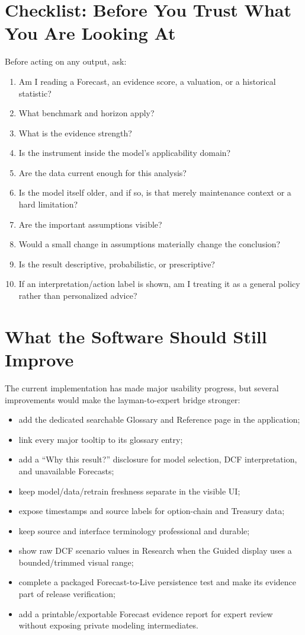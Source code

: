 \documentclass[11pt]{article}
\begin{document}
\section{Checklist: Before You Trust What You Are Looking At}
Before acting on any output, ask:
\begin{enumerate}[itemsep=0.2em]
\item Am I reading a Forecast, an evidence score, a valuation, or a historical statistic?
\item What benchmark and horizon apply?
\item What is the evidence strength?
\item Is the instrument inside the model's applicability domain?
\item Are the data current enough for this analysis?
\item Is the model itself older, and if so, is that merely maintenance context or a hard limitation?
\item Are the important assumptions visible?
\item Would a small change in assumptions materially change the conclusion?
\item Is the result descriptive, probabilistic, or prescriptive?
\item If an interpretation/action label is shown, am I treating it as a general policy rather than personalized advice?
\end{enumerate}

\section{What the Software Should Still Improve}
The current implementation has made major usability progress, but several improvements would make the layman-to-expert bridge stronger:
\begin{itemize}[itemsep=0.2em]
\item add the dedicated searchable Glossary and Reference page in the application;
\item link every major tooltip to its glossary entry;
\item add a ``Why this result?'' disclosure for model selection, DCF interpretation, and unavailable Forecasts;
\item keep model/data/retrain freshness separate in the visible UI;
\item expose timestamps and source labels for option-chain and Treasury data;
\item keep source and interface terminology professional and durable;
\item show raw DCF scenario values in Research when the Guided display uses a bounded/trimmed visual range;
\item complete a packaged Forecast-to-Live persistence test and make its evidence part of release verification;
\item add a printable/exportable Forecast evidence report for expert review without exposing private modeling intermediates.
\end{itemize}
\end{document}
